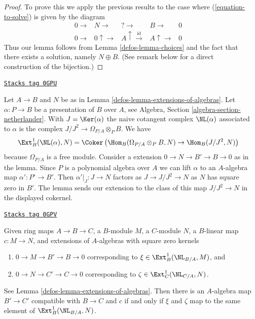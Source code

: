 \begin{proof}

To prove this we apply the previous results to the case where
(\ref{equation-to-solve}) is given by the diagram
$$
\begin{array}{ccccc}0 \longrightarrow & N \longrightarrow & {?} \longrightarrow & B \longrightarrow & 0 \\ 0 \longrightarrow & 0 \uparrow\longrightarrow & A \uparrow\overset{\text{id}}{\longrightarrow} & A \uparrow\longrightarrow & 0\end{array}
$$
Thus our lemma follows from Lemma \ref{defos-lemma-choices}
and the fact that there exists a solution, namely $N \oplus B$.
(See remark below for a direct construction of the bijection.)
\end{proof}

\begin{remark}
\label{defos-remark-extensions-of-algebras}
\href{https://stacks.math.columbia.edu/tag/0GPU}{\texttt{Stacks tag 0GPU}}

Let $A \to B$ and $N$ be as in Lemma \ref{defos-lemma-extensions-of-algebras}.
Let $\alpha : P \to B$ be a presentation of $B$ over $A$, see
Algebra, Section \ref{algebra-section-netherlander}.
With $J = \Ker(\alpha)$ the naive cotangent complex $\NL(\alpha)$
associated to $\alpha$ is the complex $J/J^2 \to \Omega_{P/A} \otimes_P B$.
We have
$$
\Ext^1_B(\NL(\alpha), N) =
\Coker\left(\Hom_B(\Omega_{P/A} \otimes_P B, N) \to \Hom_B(J/J^2, N)\right)
$$
because $\Omega_{P/A}$ is a free module.
Consider a extension $0 \to N \to B' \to B \to 0$ as in the lemma.
Since $P$ is a polynomial algebra over $A$ we can
lift $\alpha$ to an $A$-algebra map $\alpha' : P' \to B'$.
Then $\alpha'|_J : J \to N$ factors as $J \to J/J^2 \to N$
as $N$ has square zero in $B'$. The lemma sends our extension
to the class of this map $J/J^2 \to N$ in the displayed cokernel.
\end{remark}

\begin{lemma}
\label{defos-lemma-extensions-of-algebras-functorial}
\href{https://stacks.math.columbia.edu/tag/0GPV}{\texttt{Stacks tag 0GPV}}

Given ring maps $A \to B \to C$, a $B$-module $M$, a $C$-module $N$,
a $B$-linear map $c : M \to N$, and extensions of
$A$-algebras with square zero kernels
\begin{enumerate}
\item[(a)] $0 \to M \to B' \to B \to 0$ corresponding to
$\xi \in \Ext^1_B(\NL_{B/A}, M)$, and
\item[(b)] $0 \to N \to C' \to C \to 0$ corresponding to
$\zeta \in \Ext^1_C(\NL_{C/A}, N)$.
\end{enumerate}
See Lemma \ref{defos-lemma-extensions-of-algebras}.
Then there is an $A$-algebra map $B' \to C'$ compatible with
$B \to C$ and $c$ if and only if $\xi$ and $\zeta$
map to the same element of
$\Ext^1_B(\NL_{B/A}, N)$.
\end{lemma}

